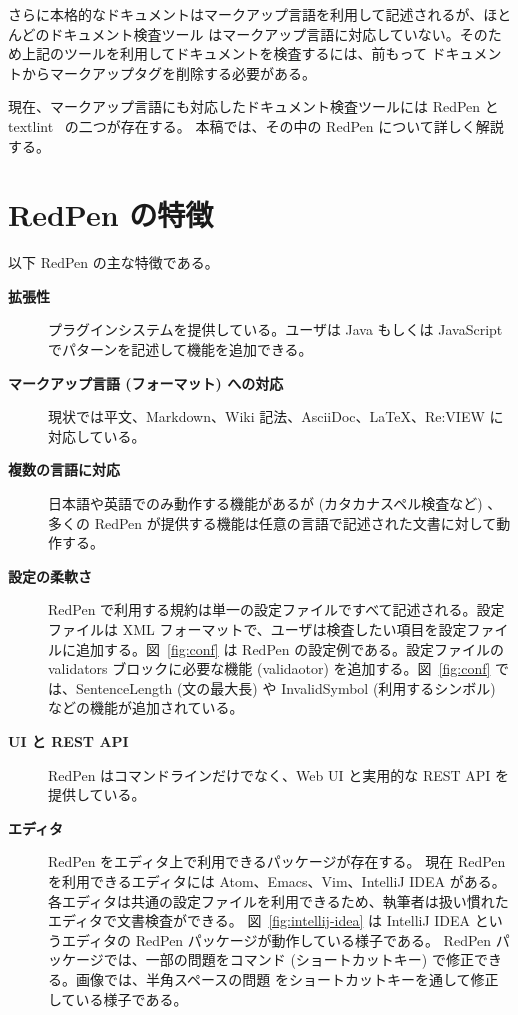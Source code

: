 さらに本格的なドキュメントはマークアップ言語を利用して記述されるが、ほとんどのドキュメント検査ツール
はマークアップ言語に対応していない。そのため上記のツールを利用してドキュメントを検査するには、前もって
ドキュメントからマークアップタグを削除する必要がある。

現在、マークアップ言語にも対応したドキュメント検査ツールには RedPen と textlint~\cite{textlint} の二つが存在する。
本稿では、その中の RedPen について詳しく解説する。

\section{RedPen の特徴}

以下 RedPen の主な特徴である。

\begin{description}
\item[{\bf 拡張性}]
  プラグインシステムを提供している。ユーザは Java もしくは JavaScript でパターンを記述して機能を追加できる。

\item[{\bf マークアップ言語 (フォーマット) への対応}]
  現状では平文、Markdown、Wiki 記法、AsciiDoc、LaTeX、Re:VIEW に対応している。

\item[{\bf 複数の言語に対応}]
  日本語や英語でのみ動作する機能があるが (カタカナスペル検査など) 、多くの RedPen が提供する機能は任意の言語で記述された文書に対して動作する。

\item[{\bf 設定の柔軟さ}]
  RedPen で利用する規約は単一の設定ファイルですべて記述される。設定ファイルは XML フォーマットで、ユーザは検査したい項目を設定ファイルに追加する。図~\ref{fig:conf} は RedPen の設定例である。設定ファイルの validators ブロックに必要な機能 (validaotor) を追加する。図~\ref{fig:conf} では、SentenceLength (文の最大長) や InvalidSymbol (利用するシンボル) などの機能が追加されている。

\item[{\bf UI と REST API}]
  RedPen はコマンドラインだけでなく、Web UI と実用的な REST API を提供している。

\item[{\bf エディタ}]
  RedPen をエディタ上で利用できるパッケージが存在する。
  現在 RedPen を利用できるエディタには Atom、Emacs、Vim、IntelliJ IDEA がある。
  各エディタは共通の設定ファイルを利用できるため、執筆者は扱い慣れたエディタで文書検査ができる。
  図~\ref{fig:intellij-idea} は IntelliJ IDEA というエディタの RedPen パッケージが動作している様子である。
  RedPen パッケージでは、一部の問題をコマンド (ショートカットキー) で修正できる。画像では、半角スペースの問題
  をショートカットキーを通して修正している様子である。
\end{description}

